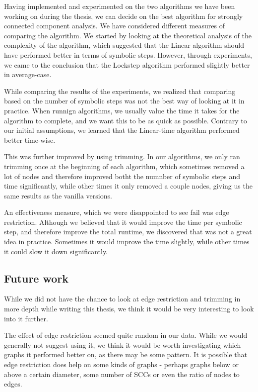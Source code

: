 \documentclass[../master/master.tex]{subfiles}
\begin{document}
Having implemented and experimented on the two algorithms we have been working on during the thesis, we can decide on the best algorithm for strongly connected component analysis. We have considered different measures of comparing the algorithm. We started by looking at the theoretical analysis of the complexity of the algorithm, which suggested that the Linear algorithm should have performed better in terms of symbolic steps. However, through experiments, we came to the conclusion that the Lockstep algorithm performed slightly better in average-case.

While comparing the results of the experiments, we realized that comparing based on the number of symbolic steps was not the best way of looking at it in practice. When runnign algorithms, we usually value the time it takes for the algorithm to complete, and we want this to be as quick as possible. Contrary to our initial assumptions, we learned that the Linear-time algorithm performed better time-wise.

This was further improved by using trimming. In our algorithms, we only ran trimming once at the beginning of each algorithm, which sometimes removed a lot of nodes and therefore improved botht the numnber of symbolic steps and time significantly, while other times it only removed a couple nodes, giving us the same results as the vanilla versions.

An effectiveness measure, which we were disappointed to see fail was edge restriction. Although we believed that it would improve the time per symbolic step, and therefore improve the total runtime, we discovered that was not a great idea in practice. Sometimes it would improve the time slightly, while other times it could slow it down significantly.

\subsection{Future work}
While we did not have the chance to look at edge restriction and trimming in more depth while writing this thesis, we think it would be very interesting to look into it further.

The effect of edge restriction seemed quite random in our data. While we would generally not suggest using it, we think it would be worth investigating which graphs it performed better on, as there may be some pattern. It is possible that edge restriction does help on some kinds of graphs - perhaps graphs below or above a certain diameter, some number of SCCs or even the ratio of nodes to edges.
\end{document}
